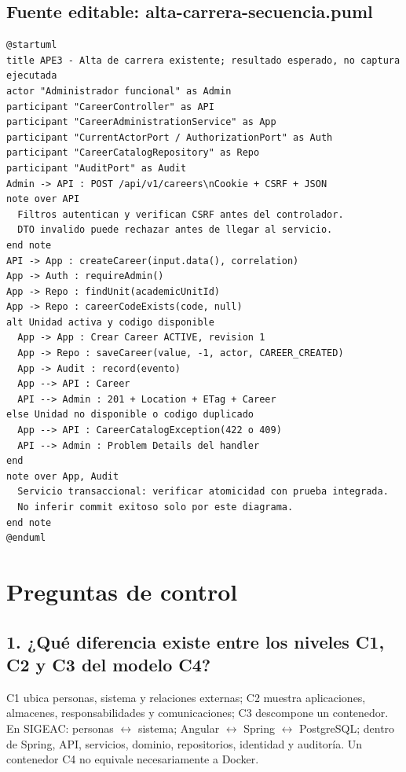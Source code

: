 \documentclass[11pt,a4paper]{article}
\begin{document}
\subsection{Fuente editable: alta-carrera-secuencia.puml}
\begin{Verbatim}[breaklines=true,breakanywhere=true,fontsize=\footnotesize]
@startuml
title APE3 - Alta de carrera existente; resultado esperado, no captura ejecutada
actor "Administrador funcional" as Admin
participant "CareerController" as API
participant "CareerAdministrationService" as App
participant "CurrentActorPort / AuthorizationPort" as Auth
participant "CareerCatalogRepository" as Repo
participant "AuditPort" as Audit
Admin -> API : POST /api/v1/careers\nCookie + CSRF + JSON
note over API
  Filtros autentican y verifican CSRF antes del controlador.
  DTO invalido puede rechazar antes de llegar al servicio.
end note
API -> App : createCareer(input.data(), correlation)
App -> Auth : requireAdmin()
App -> Repo : findUnit(academicUnitId)
App -> Repo : careerCodeExists(code, null)
alt Unidad activa y codigo disponible
  App -> App : Crear Career ACTIVE, revision 1
  App -> Repo : saveCareer(value, -1, actor, CAREER_CREATED)
  App -> Audit : record(evento)
  App --> API : Career
  API --> Admin : 201 + Location + ETag + Career
else Unidad no disponible o codigo duplicado
  App --> API : CareerCatalogException(422 o 409)
  API --> Admin : Problem Details del handler
end
note over App, Audit
  Servicio transaccional: verificar atomicidad con prueba integrada.
  No inferir commit exitoso solo por este diagrama.
end note
@enduml

\end{Verbatim}

\section{Preguntas de control}

\subsection*{1. ¿Qué diferencia existe entre los niveles C1, C2 y C3 del modelo C4?}

C1 ubica personas, sistema y relaciones externas; C2 muestra aplicaciones, almacenes, responsabilidades y comunicaciones; C3 descompone un contenedor. En SIGEAC: personas $\leftrightarrow$ sistema; Angular $\leftrightarrow$ Spring $\leftrightarrow$ PostgreSQL; dentro de Spring, API, servicios, dominio, repositorios, identidad y auditoría. Un contenedor C4 no equivale necesariamente a Docker.
\end{document}
